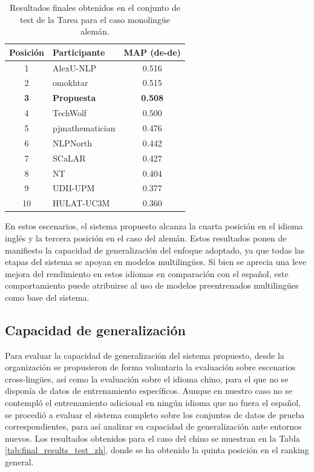 \begin{table}[ht!]
    \centering
    \begin{tabular}{clc}
        \hline
        \textbf{Posición} & \textbf{Participante} & \textbf{MAP (de-de)} \\ \hline
        1                 & AlexU-NLP             & 0.516                \\ 
        2                 & omokhtar              & 0.515                \\ 
        \textbf{3}        & \textbf{Propuesta}    & \textbf{0.508}       \\ 
        4                 & TechWolf              & 0.500                \\
        5                 & pjmathematician       & 0.476                \\ 
        6                 & NLPNorth              & 0.442                \\ 
        7                 & SCaLAR                & 0.427                \\ 
        8                 & NT                    & 0.404                \\ 
        9                 & UDII-UPM              & 0.377                \\
        10                & HULAT-UC3M            & 0.360                \\
        
        \hline
    \end{tabular}
    \caption{Resultados finales obtenidos en el conjunto de test de la \gls{Tarea} para el caso monolingüe alemán.}
    \label{tab:final_results_test_de}
\end{table}


En estos escenarios, el sistema propuesto alcanza la cuarta posición en el idioma inglés y la tercera posición en el caso del alemán. Estos resultados ponen de manifiesto la capacidad de generalización del enfoque adoptado, ya que todas las etapas del sistema se apoyan en modelos multilingües. Si bien se aprecia una leve mejora del rendimiento en estos idiomas en comparación con el español, este comportamiento puede atribuirse al uso de modelos preentrenados multilingües como base del sistema.

\subsection{Capacidad de generalización}

\noindent Para evaluar la capacidad de generalización del sistema propuesto, desde la organización se propusieron de forma voluntaria la evaluación sobre escenarios cross-lingües, así como la evaluación sobre el idioma chino, para el que no se disponía de datos de entrenamiento específicos. Aunque en nuestro caso no se contempló el entrenamiento adicional en ningún idioma que no fuera el español, se procedió a evaluar el sistema completo sobre los conjuntos de datos de prueba correspondientes, para así analizar su capacidad de generalización ante entornos nuevos. Los resultados obtenidos para el caso del chino se muestran en la Tabla \ref{tab:final_results_test_zh}, donde se ha obtenido la quinta posición en el ranking general.

